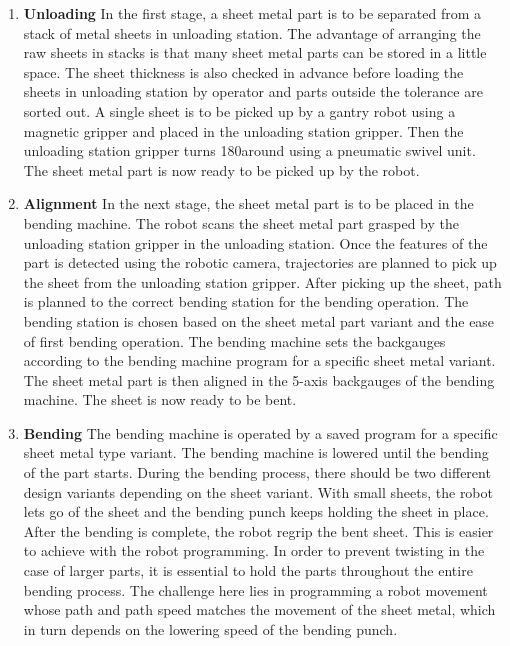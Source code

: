 \begin{enumerate}
    \item \par{\textbf{Unloading}}
    \label{par:unloading}
    In the first stage, a sheet metal part is to be separated from a stack of metal sheets in unloading station. The advantage of
    arranging the raw sheets in stacks is that many sheet metal parts can be stored in a little space. The sheet thickness is
    also checked in advance before loading the sheets in unloading station by operator and parts outside the tolerance are sorted out. A single sheet is to be picked up by a gantry robot using a magnetic gripper and placed in the unloading station gripper. Then the unloading station gripper turns 180\textdegree around using a pneumatic swivel unit. The sheet metal part is now ready to be picked up by the robot.
    
    
    \item \par{\textbf{Alignment}}
    \label{par:alignment}
    In the next stage, the sheet metal part is to be placed in the bending machine. The robot scans the sheet metal part grasped by the unloading station gripper in the unloading station. Once the features of the part is detected using the robotic camera, trajectories are planned to pick up the sheet from the unloading station gripper. After picking up the sheet, path is planned to the correct bending station for the bending operation. The bending station is chosen based on the sheet metal part variant and the ease of first bending operation. The bending machine sets the backgauges according to the bending machine program for a specific sheet metal variant. The sheet metal part is then aligned in the 5-axis backgauges of the bending machine. The sheet is now ready to be bent. 
    
    \item \par{\textbf{Bending}}
    \label{par:bending}
    The bending machine is operated by a saved program for a specific sheet metal type variant. The bending machine is lowered until the bending of the part starts. During the bending process, there should be two different design variants depending on the sheet
    variant. With small sheets, the robot lets go of the sheet and the bending punch keeps holding the sheet in place. After the bending is complete, the robot regrip the bent sheet. This is easier to achieve with the robot programming. In order to prevent twisting in the case of larger parts, it is essential to hold the parts throughout the entire bending process. The challenge here lies in programming a robot movement
    whose path and path speed matches the movement of the sheet metal, which in turn depends on the
    lowering speed of the bending punch.
    

\end{enumerate}
